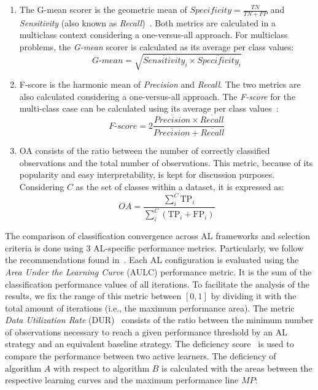 \documentclass[parskip=full]{scrartcl}
\begin{document}
\begin{enumerate}
    \item The G-mean scorer is the geometric mean of $Specificity = \frac{TN}{TN
        + FP}$ and \textit{Sensitivity} (also known as
        \textit{Recall})~\cite{Kubat1997}. Both metrics are calculated in a
        multiclass context considering a one-versus-all approach. For multiclass
        problems, the \textit{G-mean} scorer is calculated as its average per
        class values: 
        \begin{equation}\label{eq:gmean}
            \textit{G-mean} = \sqrt{\overline{Sensitivity}_i \times
            \overline{Specificity}_i}
        \end{equation}
    
    \item F-score is the harmonic mean of \textit{Precision} and
        \textit{Recall}. The two metrics are also calculated considering a
        one-versus-all approach. The \textit{F-score} for the multi-class case
        can be calculated using its average per class values~\cite{He2009}:
        \begin{equation}\label{eq:fscore}
            \textit{F-score}=2\frac{\overline{Precision} \times
            \overline{Recall}}{\overline{Precision} + \overline{Recall}}
        \end{equation}

    \item OA consists of the ratio between the number of correctly classified
        observations and the total number of observations. This metric, because of its
        popularity and easy interpretability, is kept for discussion purposes.
        Considering $C$ as the set of classes within a dataset, it is expressed as: 
        \begin{equation}\label{eq:oa}
            \textit{OA} =
            \frac{\sum_{i}^{C}{\text{TP}_{i}}}{\sum_{i}^{C}{(\text{TP}_{i} +
            \text{FP}_{i})}}
        \end{equation}

\end{enumerate}

The comparison of classification convergence across AL frameworks and selection
criteria is done using 3 AL-specific performance metrics. Particularly, we
follow the recommendations found in~\cite{Kottke2017}. Each AL configuration is
evaluated using the \textit{Area Under the Learning Curve} (AULC) performance
metric. It is the sum of the classification performance values of all
iterations. To facilitate the analysis of the results, we fix the range of this
metric between $[0,1]$ by dividing it with the total amount of
iterations (i.e., the maximum performance area). The metric \textit{Data
Utilization Rate} (DUR)~\cite{Reitmaier2013} consists of the ratio between the
minimum number of observations necessary to reach a given performance threshold
by an AL strategy and an equivalent baseline strategy. The deficiency
score~\cite{Yanik2015} is used to compare the performance between two active
learners. The deficiency of algorithm $A$ with respect to algorithm $B$ is
calculated with the areas between the respective learning curves and the maximum
performance line $MP$:
\end{document}
